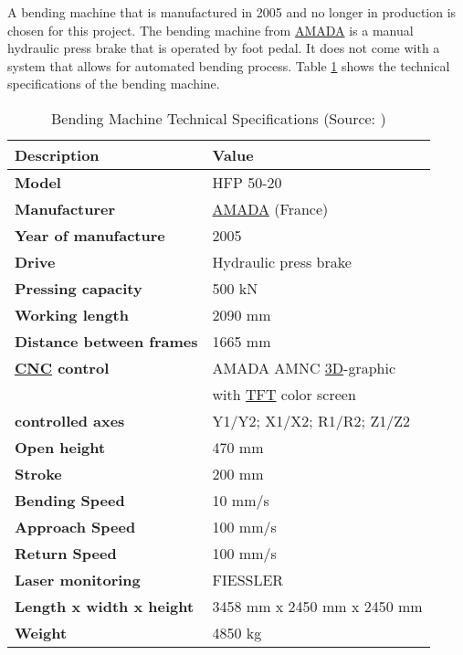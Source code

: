 A bending machine that is manufactured in 2005 and no longer in production is chosen for this project.
The bending machine from \hyperref[acro:AMADA]{AMADA} is a manual hydraulic press brake that is operated by foot pedal.
It does not come with a system that allows for automated bending process.
Table \ref{tab:machine_specifications} shows the technical specifications of the bending machine.

\begin{table}[h!]
    \centering
    \renewcommand{\arraystretch}{1.2} %
    \small
    \begin{tabular}{ll}
        {\textbf{Description}} & {\textbf{Value}} \\
        \hline
        \textbf{Model} & HFP 50-20 \\
        \textbf{Manufacturer} & \hyperref[acro:AMADA]{AMADA} (France) \\
        \textbf{Year of manufacture} & 2005 \\
        \textbf{Drive} & Hydraulic press brake \\
        \textbf{Pressing capacity} & 500 kN \\
        \textbf{Working length} & 2090 mm \\
        \textbf{Distance between frames} & 1665 mm \\
        \textbf{\hyperref[acro:CNC]{CNC} control} & AMADA AMNC \hyperref[acro:3D]{3D}-graphic \\
        & with \hyperref[acro:TFT]{TFT} color screen \\
        \textbf{controlled axes} &  Y1/Y2; X1/X2; R1/R2; Z1/Z2 \\
        \textbf{Open height} & 470 mm \\
        \textbf{Stroke} & 200 mm \\
        \textbf{Bending Speed} & 10 mm/s \\
        \textbf{Approach Speed} & 100 mm/s \\
        \textbf{Return Speed} & 100 mm/s \\
        \textbf{Laser monitoring} & FIESSLER \\
        \textbf{Length x width x height} & 3458 mm x 2450 mm x 2450 mm \\
        \textbf{Weight} & 4850 kg \\ \hline
    \end{tabular}
    \caption{Bending Machine Technical Specifications (Source: \cite{bmspecifications})}
    \label{tab:machine_specifications}
\end{table}

